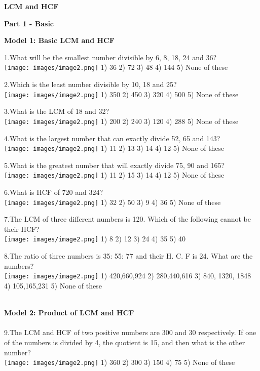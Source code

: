 \documentclass[
]{article}
\author{}
\date{}
\begin{document}
\begin{center}
	{\Large \textbf{LCM and HCF \\}}
\end{center}

{\large \textbf{Part 1 - Basic \\}}

\textbf{Model 1: Basic LCM and HCF \\}

1.What will be the smallest number divisible by 6, 8, 18, 24 and 36?\\
\texttt{[image: images/image2.png]} 1) 36 	2) 72 	3) 48 	4) 144 	5) None of these

2.Which is the least number divisible by 10, 18 and 25?\\
\texttt{[image: images/image2.png]} 1) 350 	2) 450 	3) 320 	4) 500 	5) None of these

3.What is the LCM of 18 and 32?\\
\texttt{[image: images/image2.png]} 1) 200 	2) 240 	3) 120 	4) 288 	5) None of these

4.What is the largest number that can exactly divide 52, 65 and 143?\\
\texttt{[image: images/image2.png]} 1) 11 	2) 13 	3) 14 	4) 12 	5) None of these

5.What is the greatest number that will exactly divide 75, 90 and 165?\\
\texttt{[image: images/image2.png]} 1) 11 	2) 15 	3) 14 	4) 12 	5) None of these

6.What is HCF of 720 and 324?\\
\texttt{[image: images/image2.png]} 1) 32 	2) 50 	3) 9 	4) 36 	5) None of these

7.The LCM of three different numbers is 120. Which of the following cannot be their HCF?\\
\texttt{[image: images/image2.png]} 1) 8 	2) 12 	3) 24 	4) 35 	5) 40

8.The ratio of three numbers is 35: 55: 77 and their H. C. F is 24. What are the numbers?\\
\texttt{[image: images/image2.png]} 1) 420,660,924 2) 280,440,616 3) 840, 1320, 1848 4) 105,165,231 5) None of these 

\textbf{ \\ Model 2: Product of LCM and HCF \\}
\\ 9.The LCM and HCF of two positive numbers are 300 and 30 respectively. If one of the
numbers is divided by 4, the quotient is 15, and then what is the other number?\\
\texttt{[image: images/image2.png]}  	1) 360 	2) 300 	3) 150 	4) 75 	5) None of these
\end{document}
